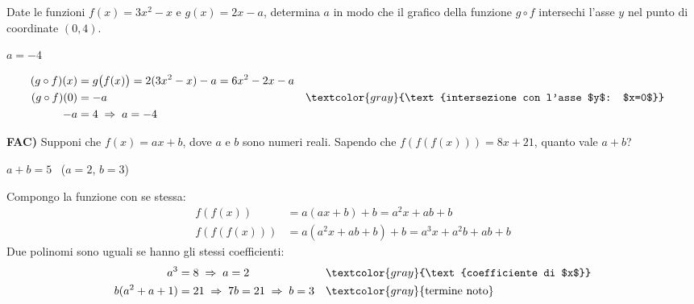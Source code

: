 
\begin{question}[ID=6.2, subtitle={Parametro $a$ per $g\circ f$ passante per $(0,4)$}, difficulty=difficile, tags={funzioni,composte,inversa}]
Date le funzioni $f(x)=3x^{2}-x$ e $g(x)=2x-a$, determina $a$ in modo che il grafico della funzione $g \circ f$ intersechi l'asse $y$ nel punto di coordinate $(0,4)$.
\begin{solution}
$a=-4$
\end{solution}
\begin{explanation}
\[\begin{aligned}
(g\circ f)(x) &= g\big(f(x)\big)=2(3x^2-x)-a=6x^2-2x-a\\
(g\circ f)(0) &= -a && \textcolor{gray}{\text{intersezione con l'asse $y$: $x=0$}}\\
-a &= 4 \;\Rightarrow\; a=-4
\end{aligned}\]
\end{explanation}
\end{question}

\begin{question}[ID=fac.1, subtitle={FAC: $f(f(f(x)))=8x+21$, trovare $a+b$}, headings=empty, difficulty=difficile, tags={funzioni,parametrico}]
\textbf{FAC)}
Supponi che \(f(x) = ax + b\), dove \(a\) e \(b\) sono numeri reali. Sapendo che \(f(f(f(x))) = 8x + 21\), quanto vale \(a + b\)?
\begin{solution}
$a+b=5$ \ ($a=2$, $b=3$)
\end{solution}
\begin{explanation}
Compongo la funzione con se stessa:
\[\begin{aligned}
f(f(x)) &= a(ax+b)+b=a^2x+ab+b\\
f(f(f(x))) &= a(a^2x+ab+b)+b=a^3x+a^2b+ab+b
\end{aligned}\]
Due polinomi sono uguali se hanno gli stessi coefficienti:
\[\begin{aligned}
a^3 &= 8 \;\Rightarrow\; a=2 && \textcolor{gray}{\text{coefficiente di $x$}}\\
b(a^2+a+1) &= 21 \;\Rightarrow\; 7b=21 \;\Rightarrow\; b=3 && \textcolor{gray}{\text{termine noto}}
\end{aligned}\]
\end{explanation}
\end{question}


